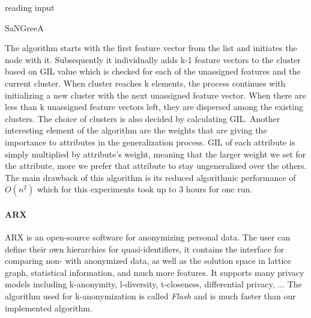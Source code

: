 \documentclass{article}
\begin{document}
\begin{algorithm}[H]
	reading input\;
	\caption{SaNGreeA}\label{sangreea}
 	
\end{algorithm}


The algorithm starts with the first feature vector from the list and initiates the node with it. Subsequently it individually adds k-1 feature vectors to the cluster based on GIL value which is checked for each of the unassigned features and the current cluster. When cluster reaches k elements, the process continues with initializing a new cluster with the next unassigned feature vector. When there are less than k unassigned feature vectors left, they are dispersed among the existing clusters. The choice of clusters is also decided by calculating GIL. 
Another interesting element of the algorithm are the weights that are giving the importance to attributes in the generalization process. GIL of each attribute is simply multiplied by attribute's weight, meaning that the larger weight we set for the attribute, more we prefer that attribute to stay ungeneralized over the others.
The main drawback of this algorithm is its reduced algorithmic performance of ${O(n^2)}$ which for this experiments took up to 3 hours for one run.

\paragraph{ARX}
ARX \cite{prasser2015putting} is an open-source software for anonymizing personal data. The user can define their own hierarchies for quasi-identifiers, it contains the interface for comparing non- with anonymized data, as well as the solution space in lattice graph, statistical information, and much more features. It supports many privacy models including k-anonymity, l-diversity, t-closeness, differential privacy, ... The algorithm used for k-anonymization is called \textit{Flash} \cite{kohlmayer2012flash} and is much faster than our implemented algorithm.
\end{document}
